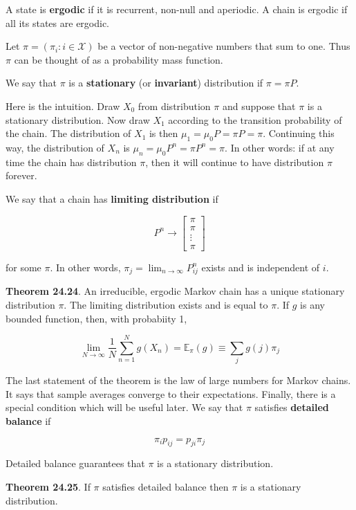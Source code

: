 A state is \textbf{ergodic} if it is recurrent, non-null and aperiodic.
A chain is ergodic if all its states are ergodic.

Let \(\pi = (\pi_i : i \in \mathcal{X})\) be a vector of non-negative
numbers that sum to one. Thus \(\pi\) can be thought of as a probability
mass function.

We say that \(\pi\) is a \textbf{stationary} (or \textbf{invariant})
distribution if \(\pi = \pi P\).

Here is the intuition. Draw \(X_0\) from distribution \(\pi\) and
suppose that \(\pi\) is a stationary distribution. Now draw \(X_1\)
according to the transition probability of the chain. The distribution
of \(X_1\) is then \(\mu_1 = \mu_0 P = \pi P = \pi\). Continuing this
way, the distribution of \(X_n\) is
\(\mu_n = \mu_0 P^n = \pi P^n = \pi\). In other words: if at any time
the chain has distribution \(\pi\), then it will continue to have
distribution \(\pi\) forever.

We say that a chain has \textbf{limiting distribution} if

\[ P^n \rightarrow \begin{bmatrix}
\pi \\ \pi \\ \vdots \\ \pi
\end{bmatrix}\]

for some \(\pi\). In other words,
\(\pi_j = \lim_{n \rightarrow \infty} P_{ij}^n\) exists and is
independent of \(i\).

\textbf{Theorem 24.24}. An irreducible, ergodic Markov chain has a
unique stationary distribution \(\pi\). The limiting distribution exists
and is equal to \(\pi\). If \(g\) is any bounded function, then, with
probabiity 1,

\[ \lim_{N \rightarrow \infty} \frac{1}{N} \sum_{n=1}^N g(X_n) = \mathbb{E}_\pi(g) \equiv \sum_j g(j) \pi_j \]

The last statement of the theorem is the law of large numbers for Markov
chains. It says that sample averages converge to their expectations.
Finally, there is a special condition which will be useful later. We say
that \(\pi\) satisfies \textbf{detailed balance} if

\[ \pi_i p_{ij} = p_{ji} \pi_j \]

Detailed balance guarantees that \(\pi\) is a stationary distribution.

\textbf{Theorem 24.25}. If \(\pi\) satisfies detailed balance then
\(\pi\) is a stationary distribution.

